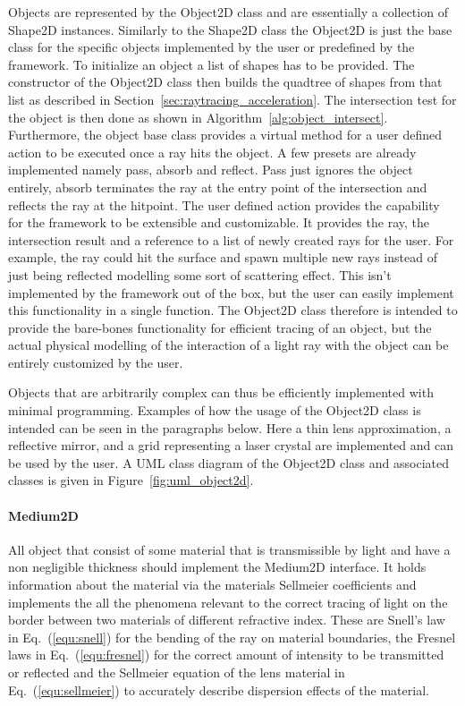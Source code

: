 \documentclass[a4paper,10pt]{article}
\newcommand{\equref}[1]{Eq.~(\ref{#1})}
\newcommand{\secref}[1]{Section~\ref{#1}}
\newcommand{\figref}[1]{Figure~\ref{#1}}
\newcommand{\algref}[1]{Algorithm~\ref{#1}}
\begin{document}
    Objects are represented by the Object2D class and are essentially a collection of
    Shape2D instances. 
    Similarly to the Shape2D class the Object2D is just the base class
    for the specific objects implemented by the user or predefined by
    the framework.
    To initialize an object a list of shapes has to be provided.
    The constructor of the Object2D class then builds the quadtree
    of shapes from that list as described in 
    \secref{sec:raytracing_acceleration}.
    The intersection test for the object is then done as shown in
    \algref{alg:object_intersect}.
    Furthermore, the object base class provides a virtual method 
    for a user defined action to be executed once a ray hits the
    object.
    A few presets are already implemented namely pass, absorb and reflect.
    Pass just ignores the object entirely, absorb terminates the ray at the
    entry point of the intersection and reflects the ray at the
    hitpoint.
    The user defined action provides the capability for the framework to
    be extensible and customizable.
    It provides the ray, the intersection result and a reference to a
    list of newly created rays for the user.
    For example, the ray could hit the surface and spawn multiple
    new rays instead of just being reflected modelling
    some sort of scattering effect.
    This isn't implemented by the framework out of the box, but
    the user can easily implement this functionality in a single
    function.
    The Object2D class therefore is intended to provide the bare-bones
    functionality for efficient tracing of an object, but the
    actual physical modelling of the interaction of a light ray
    with the object can be entirely customized by the user.

    Objects that are arbitrarily complex can thus be efficiently
    implemented with minimal programming.
    Examples of how the usage of the Object2D class is intended can
    be seen in the paragraphs below.
    Here a thin lens approximation, a reflective mirror, and a grid
    representing a laser crystal are implemented and can be used by
    the user.
    A UML class diagram of the Object2D class and associated
    classes is given in \figref{fig:uml_object2d}.

    \paragraph{Medium2D}
    All object that consist of some material that is transmissible by
    light and have a non negligible thickness should implement the
    Medium2D interface.
    It holds information about the material via the materials
    Sellmeier coefficients and implements the all the phenomena
    relevant to the correct tracing of light on the border
    between two materials of different refractive index. 
    These are Snell's law in \equref{equ:snell} for the bending of the ray on material
    boundaries, the Fresnel laws in \equref{equ:fresnel} for the
    correct amount of intensity to be transmitted or reflected and
    the Sellmeier equation of the lens material in \equref{equ:sellmeier}
    to accurately describe dispersion effects of the material.
\end{document}
